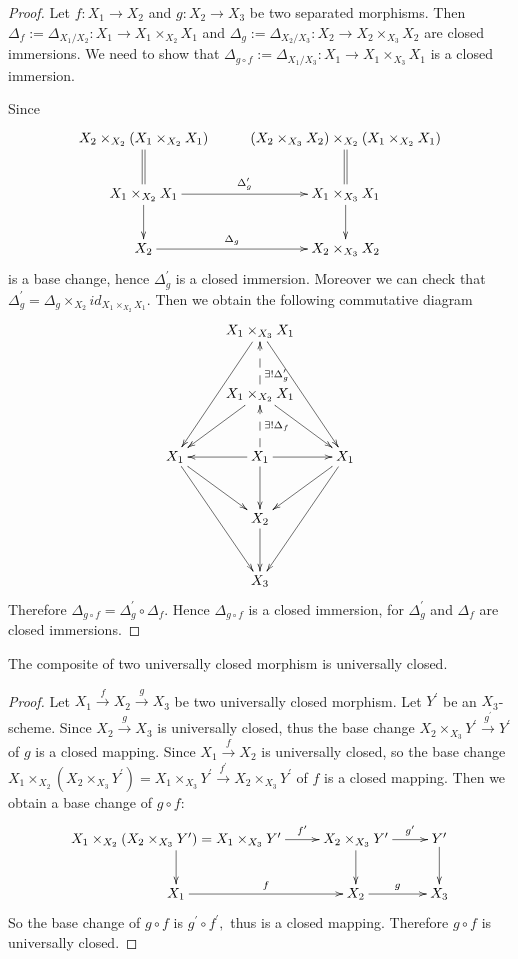 \begin{proof}
Let $f: X_1\rightarrow X_2$ and $g: X_2\rightarrow X_3$ be two
separated morphisms. Then $\Delta_f:=\Delta_{X_1/X_2}:
X_1\rightarrow X_1\times_{X_2} X_1$ and $\Delta_g:=\Delta_{X_2/X_3}:
X_2\rightarrow X_2\times_{X_3} X_2$ are closed immersions. We need
to show that $\Delta_{g\circ f}:=\Delta_{X_1/X_3}: X_1\rightarrow
X_1\times_{X_3} X_1$ is a closed immersion.

Since
\[ \xymatrix{
   {X_2\times_{X_2}(X_1\times_{X_2}X_1)} \ar@{=}[d] &
   {(X_2\times_{X_3}X_2)\times_{X_2}(X_1\times_{X_2}X_1)} \ar@{=}[d] \\
   {X_1\times_{X_2}X_1} \ar[r]^-{\Delta_g^{\prime}} \ar[d] &
   {X_1\times_{X_3}X_1} \ar[d]                              \\
   X_2 \ar[r]^-{\Delta_g} & {X_2\times_{X_3}X_2} }  \]
is a base change, hence $\Delta_g^{\prime}$ is a closed immersion.
Moreover we can check that
$\Delta_g^{\prime}=\Delta_g\times_{X_2}id_{X_1\times_{X_2}X_1}$.
Then we obtain the following commutative diagram
\[ \xymatrix@R=3em{
   & {X_1\times_{X_3} X_1} \ar"3,1" \ar"3,3"                  \\
   & {X_1\times_{X_2} X_1} \ar"3,1" \ar"3,3" \ar@{-->}[u]_(.3){\exists
   !\Delta^{\prime}_g}                                     \\
   X_1 \ar"4,2" \ar"5,2" & X_1 \ar[l] \ar[r] \ar[d] \ar@{-->}[u]_-{\exists
   !\Delta_f} & X_1 \ar"4,2" \ar"5,2"                      \\
   & X_2 \ar[d]                                               \\
   & X_3 }  \]
Therefore $\Delta_{g\circ f}=\Delta_g^{\prime}\circ\Delta_f.$ Hence
$\Delta_{g\circ f}$ is a closed immersion, for $\Delta_g^{\prime}$
and $\Delta_f$ are closed immersions.
\end{proof}
\begin{prop}
The composite of two universally closed morphism is universally
closed.
\end{prop}
\begin{proof}
Let $X_1\stackrel{f}{\rightarrow}X_2\stackrel{g}{\rightarrow}X_3$ be
two universally closed morphism. Let $Y^{\prime}$ be an
$X_3$-scheme. Since $X_2\stackrel{g}{\rightarrow}X_3$ is universally
closed, thus the base change $X_2\times_{X_3}
Y^{\prime}\stackrel{g^{\prime}}{\rightarrow}Y^{\prime}$ of $g$ is a
closed mapping. Since $X_1\stackrel{f}{\rightarrow}X_2$ is
universally closed, so the base change $X_1\times_{X_2}
(X_2\times_{X_3}Y^{\prime})=X_1\times_{X_3}
Y^{\prime}\stackrel{f^{\prime}}{\rightarrow}X_2\times_{X_3}Y^{\prime}$
of $f$ is a closed mapping. Then we obtain a base change of $g\circ
f$:
\[ \xymatrix{
   {X_1\times_{X_2}(X_2\times_{X_3}Y^{\prime})=X_1\times_{X_3}
   Y^{\prime}} \ar[d] \ar[r]^-{f^{\prime}} &
   {X_2\times_{X_3}Y^{\prime}} \ar[d] \ar[r]^-{g^{\prime}} &
   Y^{\prime} \ar[d]                                         \\
   X_1 \ar[r]^f & X_2 \ar[r]^g & X_3} \]
So the base change of $g\circ f$ is $g^{\prime}\circ f^{\prime},$
thus is a closed mapping. Therefore $g\circ f$ is universally
closed.
\end{proof}
